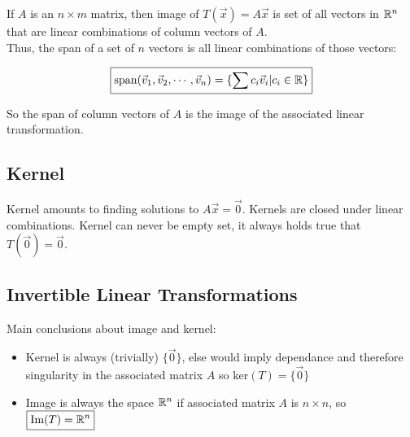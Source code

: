 If $A$ is an $n\times m$ matrix, then image of $T(\vec{x})=A\vec{x}$ is set of all vectors in $\mathbb{R}^n$
that are linear combinations of column vectors of $A$.\\

\noindent
Thus, the span of a set of $n$ vectors is all linear combinations of those vectors:

\[\boxed{
    \mathrm{span}(\vec{v}_1,\vec{v}_2,\cdots,\vec{v}_n)=\{\sum c_i\vec{v}_i | c_i\in\mathbb{R}\}
}\]

So the span of column vectors of $A$ is the image of the associated linear transformation.

\subsection{Kernel}

Kernel amounts to finding solutions to $A\vec{x}=\vec{0}$. Kernels are closed under linear combinations.
Kernel can never be empty set, it always holds true that $T(\vec{0})=\vec{0}$.

\subsection{Invertible Linear Transformations}

Main conclusions about image and kernel:

\begin{itemize}
    \item Kernel is always (trivially) $\{\vec{0}\}$, else would imply dependance and therefore singularity in the associated matrix $A$
    so $\boxed{\mathrm{ker}(T)=\{\vec{0}\}}$
    \item Image is always the space $\mathbb{R}^n$ if associated matrix $A$ is $n\times n$, so $\boxed{\mathrm{Im}(T)=\mathbb{R}^n}$
\end{itemize}